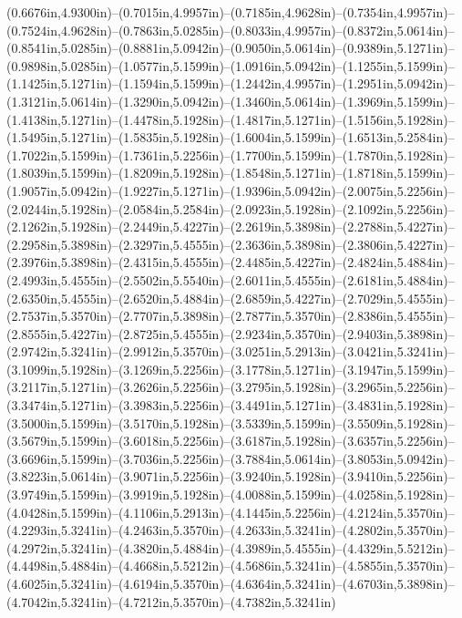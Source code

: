 (0.6676in,4.9300in)--(0.7015in,4.9957in)--(0.7185in,4.9628in)--(0.7354in,4.9957in)--(0.7524in,4.9628in)--(0.7863in,5.0285in)--(0.8033in,4.9957in)--(0.8372in,5.0614in)--(0.8541in,5.0285in)--(0.8881in,5.0942in)--(0.9050in,5.0614in)--(0.9389in,5.1271in)--(0.9898in,5.0285in)--(1.0577in,5.1599in)--(1.0916in,5.0942in)--(1.1255in,5.1599in)--(1.1425in,5.1271in)--(1.1594in,5.1599in)--(1.2442in,4.9957in)--(1.2951in,5.0942in)--(1.3121in,5.0614in)--(1.3290in,5.0942in)--(1.3460in,5.0614in)--(1.3969in,5.1599in)--(1.4138in,5.1271in)--(1.4478in,5.1928in)--(1.4817in,5.1271in)--(1.5156in,5.1928in)--(1.5495in,5.1271in)--(1.5835in,5.1928in)--(1.6004in,5.1599in)--(1.6513in,5.2584in)--(1.7022in,5.1599in)--(1.7361in,5.2256in)--(1.7700in,5.1599in)--(1.7870in,5.1928in)--(1.8039in,5.1599in)--(1.8209in,5.1928in)--(1.8548in,5.1271in)--(1.8718in,5.1599in)--(1.9057in,5.0942in)--(1.9227in,5.1271in)--(1.9396in,5.0942in)--(2.0075in,5.2256in)--(2.0244in,5.1928in)--(2.0584in,5.2584in)--(2.0923in,5.1928in)--(2.1092in,5.2256in)--(2.1262in,5.1928in)--(2.2449in,5.4227in)--(2.2619in,5.3898in)--(2.2788in,5.4227in)--(2.2958in,5.3898in)--(2.3297in,5.4555in)--(2.3636in,5.3898in)--(2.3806in,5.4227in)--(2.3976in,5.3898in)--(2.4315in,5.4555in)--(2.4485in,5.4227in)--(2.4824in,5.4884in)--(2.4993in,5.4555in)--(2.5502in,5.5540in)--(2.6011in,5.4555in)--(2.6181in,5.4884in)--(2.6350in,5.4555in)--(2.6520in,5.4884in)--(2.6859in,5.4227in)--(2.7029in,5.4555in)--(2.7537in,5.3570in)--(2.7707in,5.3898in)--(2.7877in,5.3570in)--(2.8386in,5.4555in)--(2.8555in,5.4227in)--(2.8725in,5.4555in)--(2.9234in,5.3570in)--(2.9403in,5.3898in)--(2.9742in,5.3241in)--(2.9912in,5.3570in)--(3.0251in,5.2913in)--(3.0421in,5.3241in)--(3.1099in,5.1928in)--(3.1269in,5.2256in)--(3.1778in,5.1271in)--(3.1947in,5.1599in)--(3.2117in,5.1271in)--(3.2626in,5.2256in)--(3.2795in,5.1928in)--(3.2965in,5.2256in)--(3.3474in,5.1271in)--(3.3983in,5.2256in)--(3.4491in,5.1271in)--(3.4831in,5.1928in)--(3.5000in,5.1599in)--(3.5170in,5.1928in)--(3.5339in,5.1599in)--(3.5509in,5.1928in)--(3.5679in,5.1599in)--(3.6018in,5.2256in)--(3.6187in,5.1928in)--(3.6357in,5.2256in)--(3.6696in,5.1599in)--(3.7036in,5.2256in)--(3.7884in,5.0614in)--(3.8053in,5.0942in)--(3.8223in,5.0614in)--(3.9071in,5.2256in)--(3.9240in,5.1928in)--(3.9410in,5.2256in)--(3.9749in,5.1599in)--(3.9919in,5.1928in)--(4.0088in,5.1599in)--(4.0258in,5.1928in)--(4.0428in,5.1599in)--(4.1106in,5.2913in)--(4.1445in,5.2256in)--(4.2124in,5.3570in)--(4.2293in,5.3241in)--(4.2463in,5.3570in)--(4.2633in,5.3241in)--(4.2802in,5.3570in)--(4.2972in,5.3241in)--(4.3820in,5.4884in)--(4.3989in,5.4555in)--(4.4329in,5.5212in)--(4.4498in,5.4884in)--(4.4668in,5.5212in)--(4.5686in,5.3241in)--(4.5855in,5.3570in)--(4.6025in,5.3241in)--(4.6194in,5.3570in)--(4.6364in,5.3241in)--(4.6703in,5.3898in)--(4.7042in,5.3241in)--(4.7212in,5.3570in)--(4.7382in,5.3241in)
